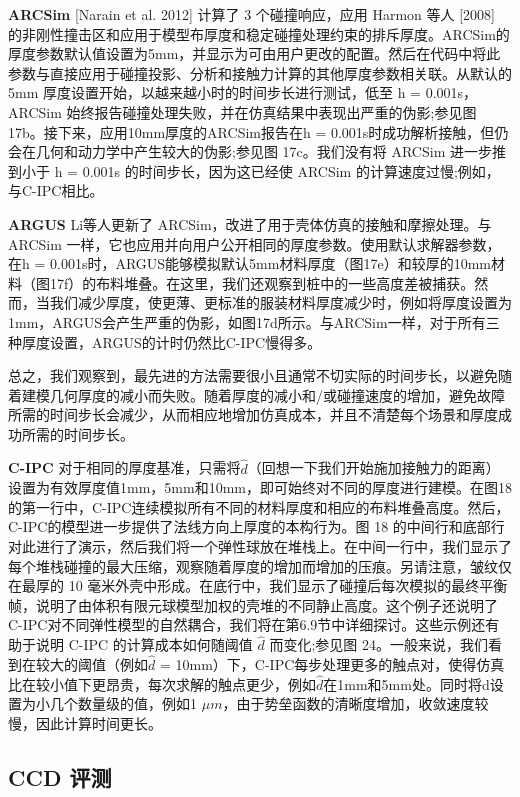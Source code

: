 \textbf{ARCSim} [Narain et al. 2012] 计算了 3 个碰撞响应，应用 Harmon 等人 [2008] 的非刚性撞击区和应用于模型布厚度和稳定碰撞处理约束的排斥厚度。ARCSim的厚度参数默认值设置为5mm，并显示为可由用户更改的配置。然后在代码中将此参数与直接应用于碰撞投影、分析和接触力计算的其他厚度参数相关联。从默认的 5mm 厚度设置开始，以越来越小时的时间步长进行测试，低至 h = 0.001s，ARCSim 始终报告碰撞处理失败，并在仿真结果中表现出严重的伪影;参见图 17b。接下来，应用10mm厚度的ARCSim报告在h = 0.001s时成功解析接触，但仍会在几何和动力学中产生较大的伪影;参见图 17c。我们没有将 ARCSim 进一步推到小于 h = 0.001s 的时间步长，因为这已经使 ARCSim 的计算速度过慢;例如，与C-IPC相比。

\textbf{ARGUS} Li等人更新了 ARCSim，改进了用于壳体仿真的接触和摩擦处理。与 ARCSim 一样，它也应用并向用户公开相同的厚度参数。使用默认求解器参数，在h = 0.001s时，ARGUS能够模拟默认5mm材料厚度（图17e）和较厚的10mm材料（图17f）的布料堆叠。在这里，我们还观察到桩中的一些高度差被捕获。然而，当我们减少厚度，使更薄、更标准的服装材料厚度减少时，例如将厚度设置为1mm，ARGUS会产生严重的伪影，如图17d所示。与ARCSim一样，对于所有三种厚度设置，ARGUS的计时仍然比C-IPC慢得多。

总之，我们观察到，最先进的方法需要很小且通常不切实际的时间步长，以避免随着建模几何厚度的减小而失败。随着厚度的减小和/或碰撞速度的增加，避免故障所需的时间步长会减少，从而相应地增加仿真成本，并且不清楚每个场景和厚度成功所需的时间步长。

\textbf{C-IPC} 对于相同的厚度基准，只需将$\hat d$（回想一下我们开始施加接触力的距离）设置为有效厚度值1mm，5mm和10mm，即可始终对不同的厚度进行建模。在图18的第一行中，C-IPC连续模拟所有不同的材料厚度和相应的布料堆叠高度。然后，C-IPC的模型进一步提供了法线方向上厚度的本构行为。图 18 的中间行和底部行对此进行了演示，然后我们将一个弹性球放在堆栈上。在中间一行中，我们显示了每个堆栈碰撞的最大压缩，观察随着厚度的增加而增加的压痕。另请注意，皱纹仅在最厚的 10 毫米外壳中形成。在底行中，我们显示了碰撞后每次模拟的最终平衡帧，说明了由体积有限元球模型加权的壳堆的不同静止高度。这个例子还说明了C-IPC对不同弹性模型的自然耦合，我们将在第6.9节中详细探讨。这些示例还有助于说明 C-IPC 的计算成本如何随阈值 $\hat d$ 而变化;参见图 24。一般来说，我们看到在较大的阈值（例如$\hat d$ = 10mm）下，C-IPC每步处理更多的触点对，使得仿真比在较小值下更昂贵，每次求解的触点更少，例如$\hat d$在1mm和5mm处。同时将d设置为小几个数量级的值，例如1 $\mu m$，由于势垒函数的清晰度增加，收敛速度较慢，因此计算时间更长。

\subsection{CCD 评测}

